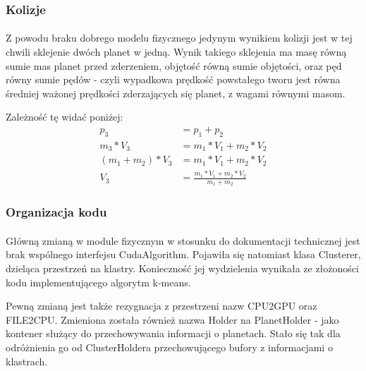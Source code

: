 \subsubsection{Kolizje}
\paragraph{}

Z powodu braku dobrego modelu fizycznego jedynym wynikiem kolizji jest w tej chwili sklejenie dwóch planet w jedną. Wynik takiego sklejenia ma masę równą sumie mas planet przed zderzeniem, objętość równą sumie objętości, oraz pęd równy sumie pędów - czyli wypadkowa prędkość powstałego tworu jest równa średniej ważonej prędkości zderzających się planet, z wagami równymi masom.

Zależność tę widać poniżej:
\begin{align}
p_3 & = p_1 + p_2 \\
m_3 * V_3 & = m_1 * V_1 + m_2 * V_2 \\
( m_1 + m_2 ) * V_3 & = m_1 * V_1 + m_2 * V_2 \\
V_3 & = \frac{ m_1 * V_1 + m_2 * V_2 }{ m_1 + m_2 }
\end{align}

\subsubsection{Organizacja kodu}

\paragraph{}

Główną zmianą w module fizycznym w stosunku do dokumentacji technicznej jest brak wspólnego interfejsu CudaAlgorithm. Pojawiła się natomiast klasa Clusterer, dzieląca przestrzeń na klastry. Konieczność jej wydzielenia wynikała ze złożoności kodu implementującego algorytm k-means.

Pewną zmianą jest także rezygnacja z przestrzeni nazw CPU2GPU oraz FILE2CPU. Zmieniona została również nazwa Holder na PlanetHolder - jako kontener służący do przechowywania informacji o planetach. Stało się tak dla odróżnienia go od ClusterHoldera przechowującego bufory z informacjami o klastrach.



